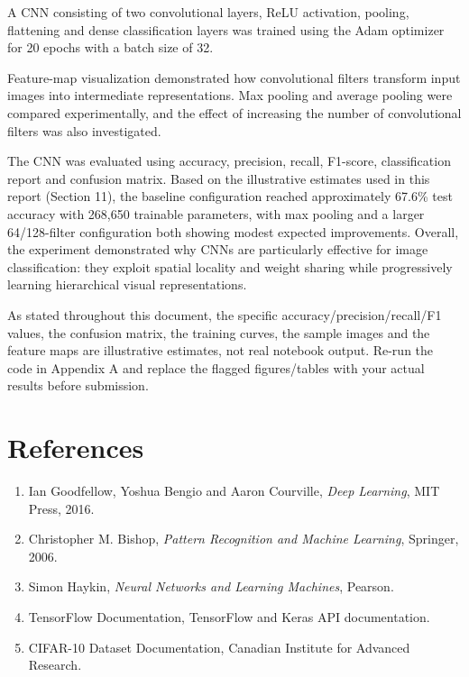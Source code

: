 \documentclass[11pt]{article}
\begin{document}
A CNN consisting of two convolutional layers, ReLU activation, pooling, flattening and dense classification layers was trained using the Adam optimizer for 20 epochs with a batch size of 32.

Feature-map visualization demonstrated how convolutional filters transform input images into intermediate representations. Max pooling and average pooling were compared experimentally, and the effect of increasing the number of convolutional filters was also investigated.

The CNN was evaluated using accuracy, precision, recall, F1-score, classification report and confusion matrix. Based on the illustrative estimates used in this report (Section 11), the baseline configuration reached approximately 67.6\% test accuracy with 268,650 trainable parameters, with max pooling and a larger 64/128-filter configuration both showing modest expected improvements. Overall, the experiment demonstrated why CNNs are particularly effective for image classification: they exploit spatial locality and weight sharing while progressively learning hierarchical visual representations.

\begin{estbox}
As stated throughout this document, the specific accuracy/precision/recall/F1 values, the confusion matrix, the training curves, the sample images and the feature maps are illustrative estimates, not real notebook output. Re-run the code in Appendix A and replace the flagged figures/tables with your actual results before submission.
\end{estbox}

\section{References}
\begin{enumerate}
    \item Ian Goodfellow, Yoshua Bengio and Aaron Courville, \textit{Deep Learning}, MIT Press, 2016.
    \item Christopher M. Bishop, \textit{Pattern Recognition and Machine Learning}, Springer, 2006.
    \item Simon Haykin, \textit{Neural Networks and Learning Machines}, Pearson.
    \item TensorFlow Documentation, TensorFlow and Keras API documentation.
    \item CIFAR-10 Dataset Documentation, Canadian Institute for Advanced Research.
\end{enumerate}
\end{document}
